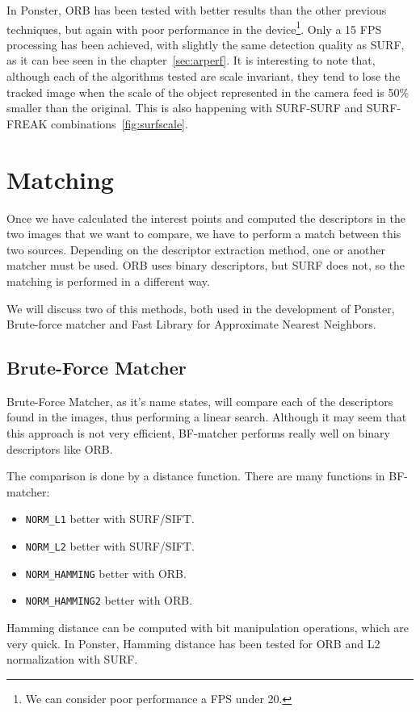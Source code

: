 In Ponster, ORB has been tested with better results than the other previous
techniques, but again with poor performance in the device\footnote{We can
  consider poor performance a FPS under 20.}. Only a 15 FPS
processing has been achieved, with slightly the same detection quality as
SURF, as it can bee seen in the chapter~\ref{sec:arperf}. It is interesting to
note that, although each of the algorithms tested 
are scale invariant, they tend to lose the tracked image when the scale of the object
represented in the camera feed is 50\% smaller than the original. This is also
happening with SURF-SURF and SURF-FREAK combinations~\ref{fig:surfscale}.

\section{Matching}
Once we have calculated the interest points and computed the descriptors in the
two images that we want to compare, we have to perform a match between this two
sources. Depending on the descriptor extraction method, one or another matcher
must be used. ORB uses binary descriptors, but SURF does not, so the matching
is performed in a different way.

We will discuss two of this methods, both used in the development of Ponster,
Brute-force matcher and Fast Library for Approximate Nearest Neighbors. 

\subsection{Brute-Force Matcher}
Brute-Force Matcher, as it's name states, will compare each of the descriptors
found in the images, thus performing a linear search. Although it may seem that
this approach is not very efficient, BF-matcher performs really well on binary
descriptors like ORB. 

The comparison is done by a distance function. There are many functions in
BF-matcher:
\begin{itemize}
\item \texttt{NORM\_L1} better with SURF/SIFT.
\item \texttt{NORM\_L2} better with SURF/SIFT.
\item \texttt{NORM\_HAMMING} better with ORB.
\item \texttt{NORM\_HAMMING2} better with ORB.
\end{itemize}
Hamming distance can be computed with bit manipulation operations, which are
very quick. In Ponster, Hamming distance has been tested for ORB and L2
normalization with SURF. 

